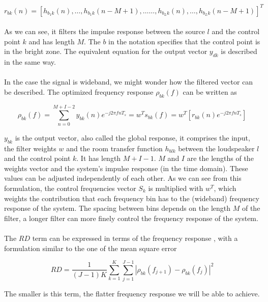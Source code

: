 \[ r_{bk}(n) = [h_{b_1k}(n),\dots,h_{b_1k}(n-M+1),\dots\dots, h_{b_Lk}(n),\dots,h_{b_Lk}(n-M+1)]^T\]
\\
As we can see, it filters the impulse response between the source $l$ and the control point $k$ and has length $M$. 
The $b$ in the notation specifies that the control point is in the bright zone. The equivalent equation for the output vector $y_{dk}$ is described in the same way.
\\
\\
In the case the signal is wideband, we might wonder how the filtered vector can be described. The optimized frequency response $\rho_{bk}(f)$  can be written as

\begin{equation}
\rho_{bk}(f) = \sum\limits_{n=0}^{M+I-2} y_{bk}(n) e^{-j2\pi f n T_s}=w^T s_{bk}(f)=w^T [r_{bk}(n) e^{-j2\pi f n T_s}]
\label{eqn:freqresp}
\end{equation}

$y_{bk}$ is the output vector, also called the global response, it comprises the input, the filter weights $w$ and the room transfer function $h_{blk}$ between the loudspeaker $l$ and the control point $k$. It has length $M+I-1$.
$M$ and $I$ are the lengths of the weights vector and the system's impulse response (in the time domain). These values can be adjusted independently of each other. As we can see from this formulation, the control frequencies vector $S_k$ is multiplied with $w^T$, which weights the contribution that each frequency bin has to the (wideband) frequency response of the system. The spacing between bins depends on the length $M$ of the filter, a longer filter can more finely control the frequency response of the system.
\\
\\
The $RD$ term can be expressed in terms of the frequency response \parencite{cai_time-domain_2014,schellekens_time_2016}, with a formulation similar to the one of the mean square error

\begin{equation}
RD = \frac{1}{(J-1) K} \sum\limits_{k=1}^{K} \sum\limits_{j=1}^{J-1} |\rho_{bk}(f_{j+1}) - \rho_{bk}(f_j)|^2
\label{eqn:RDfreqresp}
\end{equation}

The smaller is this term, the flatter frequency response we will be able to achieve.

